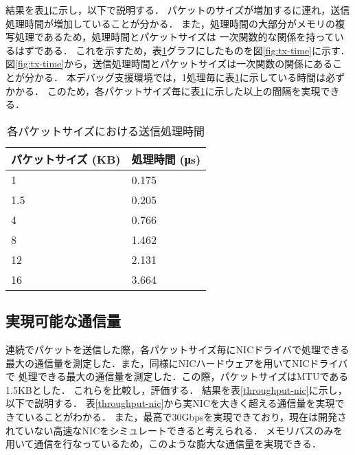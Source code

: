 \documentclass[submit,techreq,noauthor,dvipdfmx]{ipsj}
\begin{document}
結果を表\ref{tx-time}に示し，以下で説明する．
パケットのサイズが増加するに連れ，送信処理時間が増加していることが分かる．
また，処理時間の大部分がメモリの複写処理であるため，処理時間とパケットサイズは
一次関数的な関係を持っているはずである．
これを示すため，表\ref{tx-time}グラフにしたものを図\ref{fig:tx-time}に示す．
図\ref{fig:tx-time}から，送信処理時間とパケットサイズは一次関数の関係にあることが分かる．
本デバッグ支援環境では，1処理毎に表\ref{tx-time}に示している時間は必ずかかる．
このため，各パケットサイズ毎に表\ref{tx-time}に示した以上の間隔を実現できる．


\begin{table}[h]
    \caption{各パケットサイズにおける送信処理時間}
    \label{tx-time}
    \begin{center}
        \begin{tabular}{l|l}   \hline \hline 
            パケットサイズ (KB)      & 処理時間 (μs)    \\ \hline
            1                        & 0.175            \\
            1.5                      & 0.205            \\
            4                        & 0.766            \\
            8                        & 1.462            \\
            12                       & 2.131            \\
            16                       & 3.664            \\ \hline
        \end{tabular}
    \end{center}
\end{table}

\subsection{実現可能な通信量}\label{sec:interval}

連続でパケットを送信した際，各パケットサイズ毎にNICドライバで処理できる
最大の通信量を測定した．また，同様にNICハードウェアを用いてNICドライバで
処理できる最大の通信量を測定した．この際，パケットサイズはMTUである1.5KBとした．
これらを比較し，評価する．
結果を表\ref{throughput-nic}に示し，以下で説明する．
表\ref{throughput-nic}から実NICを大きく超える通信量を実現できていることがわかる．
また，最高で30Gbpsを実現できており，現在は開発されていない高速なNICをシミュレートできると考えられる．
メモリバスのみを用いて通信を行なっているため，このような膨大な通信量を実現できる．
\end{document}

